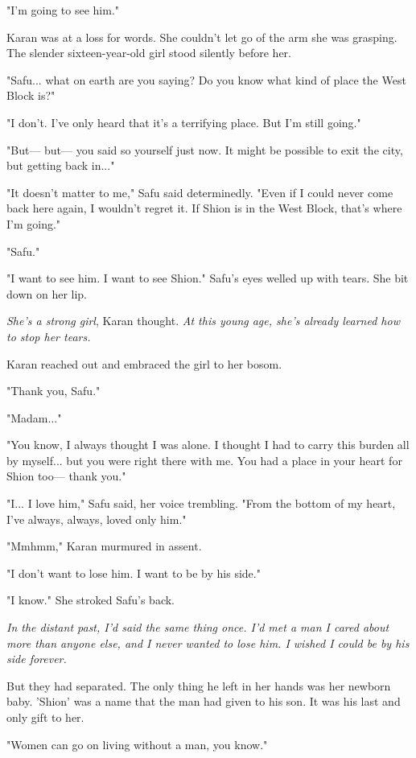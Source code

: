 "I'm going to see him."

\mybreak

Karan was at a loss for words. She couldn't let go of the arm she was
grasping. The slender sixteen-year-old girl stood silently before her.

"Safu... what on earth are you saying? Do you know what kind of place
the West Block is?"

"I don't. I've only heard that it's a terrifying place. But I'm still
going."

"But--- but--- you said so yourself just now. It might be possible to exit
the city, but getting back in..."

"It doesn't matter to me," Safu said determinedly. "Even if I could
never come back here again, I wouldn't regret it. If Shion is in the
West Block, that's where I'm going."

"Safu."

"I want to see him. I want to see Shion." Safu's eyes welled up with
tears. She bit down on her lip.

\emph{She's a strong girl}, Karan thought. \emph{At this young age, she's already
learned how to stop her tears.}

Karan reached out and embraced the girl to her bosom.

"Thank you, Safu."

"Madam..."

"You know, I always thought I was alone. I thought I had to carry this
burden all by myself... but you were right there with me. You had a
place in your heart for Shion too--- thank you."

"I... I love him," Safu said, her voice trembling. "From the bottom of
my heart, I've always, always, loved only him."

"Mmhmm," Karan murmured in assent.

"I don't want to lose him. I want to be by his side."

"I know." She stroked Safu's back.

\emph{In the distant past, I'd said the same thing once. I'd met a man I cared
about more than anyone else, and I never wanted to lose him. I wished I
could be by his side forever.}

But they had separated. The only thing he left in her hands was her
newborn baby. 'Shion' was a name that the man had given to his son. It
was his last and only gift to her.

"Women can go on living without a man, you know."

